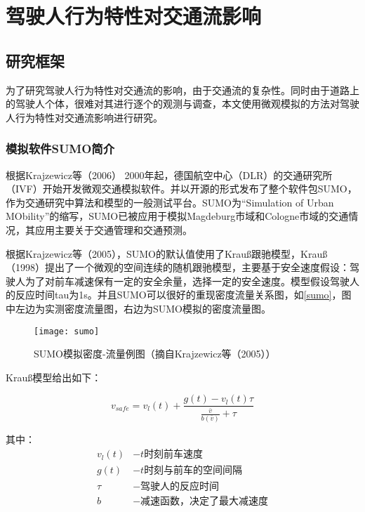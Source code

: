 \chapter{驾驶人行为特性对交通流影响}
\section{研究框架}
为了研究驾驶人行为特性对交通流的影响，由于交通流的复杂性。同时由于道路上的驾驶人个体，很难对其进行逐个的观测与调查，本文使用微观模拟的方法对驾驶人行为特性对交通流影响进行研究。
\subsection{模拟软件SUMO简介}

根据Krajzewicz等（2006）\cite{Krajzewicz2006}
2000年起，德国航空中心（DLR）的交通研究所（IVF）开始开发微观交通模拟软件。并以开源的形式发布了整个软件包SUMO，作为交通研究中算法和模型的一般测试平台。SUMO为“Simulation of Urban MObility”的缩写，SUMO已被应用于模拟Magdeburg市域和Cologne市域的交通情况，其应用主要关于交通管理和交通预测。

根据Krajzewicz等（2005）\cite{Krajzewicz2005}，SUMO的默认值使用了Krauß跟驰模型，Krauß（1998）\cite{Krauss1998}提出了一个微观的空间连续的随机跟驰模型，主要基于安全速度假设：驾驶人为了对前车减速保有一定的安全余量，选择一定的安全速度。模型假设驾驶人的反应时间tau为1s。并且SUMO可以很好的重现密度流量关系图，如\autoref{sumo}，图中左边为实测密度流量图，右边为SUMO模拟的密度流量图。

\begin{figure}[!htb]
\begin{center}
\texttt{[image: sumo]}
\end{center}
\caption{SUMO模拟密度-流量例图（摘自Krajzewicz等（2005）\cite{Krajzewicz2005}）}
\label{sumo}
\end{figure}

Krauß模型给出如下：

\begin{equation}
v_{safe}=v_l(t)+\frac{g(t)-v_l(t)\tau}{\frac{\bar{v}}{b(\bar{v})}+\tau}
\end{equation}

其中：
\begin{displaymath}
{\begin{aligned}
v_l(t)&-t\text{时刻前车速度}\\
g(t)&-t\text{时刻与前车的空间间隔}\\
\tau&-\text{驾驶人的反应时间}\\
b&-\text{减速函数，决定了最大减速度}\\
\end{aligned}}
\end{displaymath}


